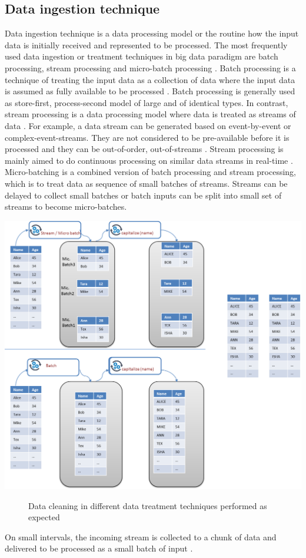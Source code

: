 \subsection{Data ingestion technique}
Data ingestion technique is a data processing model or the routine how the input data is initially received and represented to be processed. The most frequently used data ingestion or treatment techniques in big data paradigm are batch processing, stream processing and micro-batch processing \cite{dataflow}. Batch processing is a technique of treating the input data as a collection of data where the input data is assumed as fully available to be processed \cite{Sims-387}. Batch processing is generally used as store-first, process-second model of large and of identical types. In contrast, stream processing is a data processing model where data is treated as streams of data \cite{beyondbatchprocessing}. For example, a data stream can be generated based on event-by-event or complex-event-streams. They are not considered to be pre-available before it is processed and they can be out-of-order, out-of-streams \cite{beyondbatchprocessing} \cite{Sims-387}. Stream processing is mainly aimed to do continuous processing on similar data streams in real-time \cite{8reqofrealtime}. Micro-batching is a combined version of batch processing and stream processing, which is to treat data as sequence of small batches of streams. Streams can be delayed to collect small batches or batch inputs can be split into small set of streams to become micro-batches. 
\begin{center}
	\includegraphics[width=38em]{./Figures/batch-cleaning-right}
	\begin{figure}[htbp]
    \caption{Data cleaning in different data treatment techniques performed as expected}
    \label{fig:streamcorrect}
	\end{figure}
\end{center}
 On small intervals, the incoming stream is collected to a chunk of data and delivered to be processed as a small batch of input \cite{beyondbatchprocessing}. 
 
